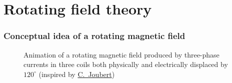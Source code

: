 \section{Rotating field theory}


\begin{frame}
	\frametitle{Conceptual idea of a rotating magnetic field}
    \begin{figure}
        \centering
        \caption{Animation of a rotating magnetic field produced by three-phase currents in three coils both physically and electrically displaced by $120^\circ$ (inspired by \href{https://perso.univ-lyon1.fr/charles.joubert/web_anim/simen_rotfield_create.html}{C.~Joubert})}
        \label{fig:Three_phase_coils_rotating_field_animation}
    \end{figure}
\end{frame}

